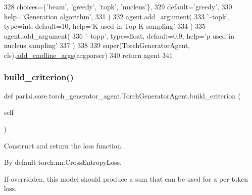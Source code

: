 \begin{DoxyCode}
328             choices=\{\textcolor{stringliteral}{'beam'}, \textcolor{stringliteral}{'greedy'}, \textcolor{stringliteral}{'topk'}, \textcolor{stringliteral}{'nucleus'}\},
329             default=\textcolor{stringliteral}{'greedy'},
330             help=\textcolor{stringliteral}{'Generation algorithm'},
331         )
332         agent.add\_argument(
333             \textcolor{stringliteral}{'--topk'}, type=int, default=10, help=\textcolor{stringliteral}{'K used in Top K sampling'}
334         )
335         agent.add\_argument(
336             \textcolor{stringliteral}{'--topp'}, type=float, default=0.9, help=\textcolor{stringliteral}{'p used in nucleus sampling'}
337         )
338 
339         super(TorchGeneratorAgent, cls).\hyperlink{namespaceparlai_1_1agents_1_1drqa_1_1config_a62fdd5554f1da6be0cba185271058320}{add\_cmdline\_args}(argparser)
340         \textcolor{keywordflow}{return} agent
341 
\end{DoxyCode}
\mbox{\label{classparlai_1_1core_1_1torch__generator__agent_1_1TorchGeneratorAgent_a8f8437dd8d0dc44f941dbc6182121284}} 
\subsubsection{\texorpdfstring{build\+\_\+criterion()}{build\_criterion()}}
{\footnotesize\ttfamily def parlai.\+core.\+torch\+\_\+generator\+\_\+agent.\+Torch\+Generator\+Agent.\+build\+\_\+criterion (\begin{DoxyParamCaption}\item[{}]{self }\end{DoxyParamCaption})}

\begin{DoxyVerb}Construct and return the loss function.

By default torch.nn.CrossEntropyLoss.

If overridden, this model should produce a sum that can be used for a per-token loss.
\end{DoxyVerb}
 

